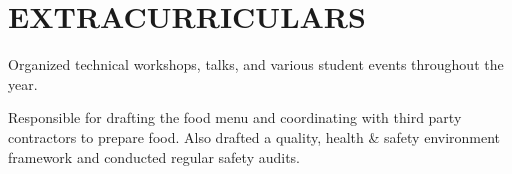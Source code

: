 \section{EXTRACURRICULARS}
\vspace{5pt}


{Organized technical workshops, talks, and various student events throughout the year.}

\vspace{5pt}

{Responsible for drafting the food menu and coordinating with third party contractors to prepare food.
    Also drafted a quality, health \& safety environment framework and conducted regular safety audits.}

\vspace{5pt}
